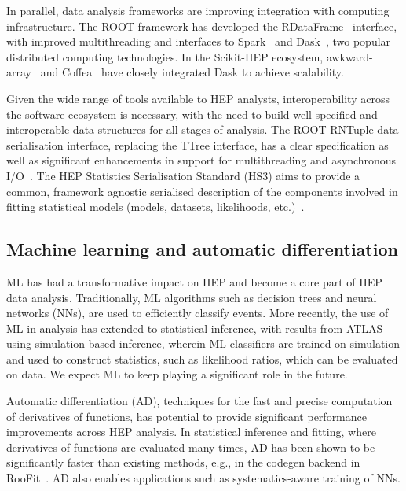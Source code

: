 \documentclass[10pt,a4paper]{article}
\begin{document}
In parallel, data analysis frameworks are improving integration with computing
infrastructure. The ROOT framework has developed the
RDataFrame~\cite{ROOT:RDataFrame} interface, with improved
multithreading and interfaces to Spark~\cite{10.1145/2934664}
and Dask~\cite{matthew_rocklin-proc-scipy-2015}, two popular distributed
computing technologies. In the Scikit-HEP ecosystem,
awkward-array~\cite{Pivarski_2020} and Coffea~\cite{Smith_2020} have closely
integrated Dask to achieve scalability.

Given the wide range of tools available to HEP analysts, interoperability across
the software ecosystem is necessary, with the need to build well-specified and
interoperable data structures for all stages of analysis. The ROOT RNTuple data
serialisation interface, replacing the TTree interface, has a clear
specification as well as significant enhancements in support for multithreading
and asynchronous I/O~\cite{ROOT:RDataFrame_prod_path}. The
HEP Statistics Serialisation Standard (HS3) aims to provide a common, framework
agnostic serialised description of the components involved in fitting
statistical models (models, datasets, likelihoods,
etc.)~\cite{HS3github}.

\subsection{Machine learning and automatic
differentiation}\label{machine-learning-and-automatic-differentiation}

ML has had a transformative impact on HEP and become a core part of HEP data
analysis. Traditionally, ML algorithms such as decision trees and neural
networks (NNs), are used to efficiently classify events. More recently, the use
of ML in analysis has extended to statistical inference, with results from
ATLAS~\cite{ATLAS:2024_hzz_higgs, ATLAS:neural_sim_inference}
using simulation-based inference, wherein ML classifiers are trained on
simulation and used to construct statistics, such as likelihood ratios, which
can be evaluated on data. We expect ML to keep playing a significant role in the
future.

Automatic differentiation (AD), techniques for the fast and precise computation
of derivatives of functions, has potential to provide significant performance
improvements across HEP analysis. In statistical inference and fitting, where
derivatives of functions are evaluated many times, AD has been shown to be
significantly faster than existing methods, e.g., in the codegen backend in
RooFit~\cite{Hageboeck:2020dyv}. AD also enables applications such as
systematics-aware training of NNs.
\end{document}
